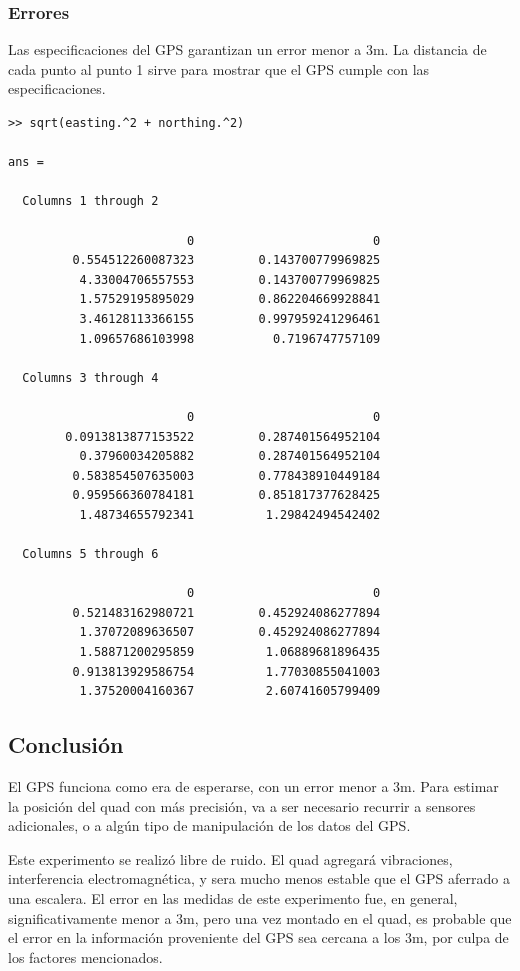 \documentclass[spanish,12pt,a4paper,titlepage]{report}
\begin{document}
\newpage
\subsubsection*{Errores}
\label{sec:errores}

Las especificaciones del GPS garantizan un error menor a 3m. La distancia de cada punto al punto 1 sirve para mostrar que el GPS cumple con las especificaciones. 

\begin{verbatim}
>> sqrt(easting.^2 + northing.^2)

ans =

  Columns 1 through 2

                         0                         0
         0.554512260087323         0.143700779969825
          4.33004706557553         0.143700779969825
          1.57529195895029         0.862204669928841
          3.46128113366155         0.997959241296461
          1.09657686103998           0.7196747757109

  Columns 3 through 4

                         0                         0
        0.0913813877153522         0.287401564952104
          0.37960034205882         0.287401564952104
         0.583854507635003         0.778438910449184
         0.959566360784181         0.851817377628425
          1.48734655792341          1.29842494542402

  Columns 5 through 6

                         0                         0
         0.521483162980721         0.452924086277894
          1.37072089636507         0.452924086277894
          1.58871200295859          1.06889681896435
         0.913813929586754          1.77030855041003
          1.37520004160367          2.60741605799409
\end{verbatim}

\subsection{Conclusión}
\label{sec:error-lat-lon-conclusion}

El GPS funciona como era de esperarse, con un error menor a 3m. Para estimar la posición del quad con más precisión, va a ser necesario recurrir a sensores adicionales, o a algún tipo de manipulación de los datos del GPS.

Este experimento se realizó libre de ruido. El quad agregará vibraciones, interferencia electromagnética, y sera mucho menos estable que el GPS aferrado a una escalera. El error en las medidas de este experimento fue, en general, significativamente menor a 3m, pero una vez montado en el quad, es probable que el error en la información proveniente del GPS sea cercana a los 3m, por culpa de los factores mencionados.
\end{document}
